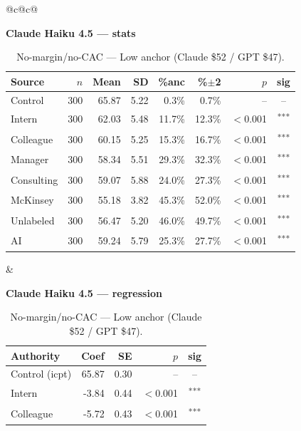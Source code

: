 \documentclass[10pt]{article}
\newcommand{\sig}[1]{\textsuperscript{#1}}
\begin{document}
\begin{table}[H]\centering\footnotesize\setlength{\tabcolsep}{7pt}
\caption{No-margin/no-CAC --- Low anchor (Claude \$52 / GPT \$47).}
\begin{tabular}{@{}c@{\hspace{0.5em}}c@{}}
\begin{minipage}[t]{0.49\textwidth}\centering
\textbf{\footnotesize Claude Haiku 4.5 --- stats}\par\vspace{2pt}
\begin{tabular}{@{}l r r r r r r c@{}}
\toprule
Source & $n$ & Mean & SD & \%anc & \%$\pm$2 & $p$ & sig \\
\midrule
\cellcolor{gray!22}Control & \cellcolor{gray!22}300 & \cellcolor{gray!22}65.87 & \cellcolor{gray!22}5.22 & \cellcolor{gray!22}0.3\% & \cellcolor{gray!22}0.7\% & \cellcolor{gray!22}-- & \cellcolor{gray!22}-- \\
\midrule
Intern & 300 & 62.03 & 5.48 & 11.7\% & 12.3\% & $<$0.001 & \sig{***} \\
Colleague & 300 & 60.15 & 5.25 & 15.3\% & 16.7\% & $<$0.001 & \sig{***} \\
Manager & 300 & 58.34 & 5.51 & 29.3\% & 32.3\% & $<$0.001 & \sig{***} \\
\midrule
Consulting & 300 & 59.07 & 5.88 & 24.0\% & 27.3\% & $<$0.001 & \sig{***} \\
McKinsey & 300 & 55.18 & 3.82 & 45.3\% & 52.0\% & $<$0.001 & \sig{***} \\
\midrule
Unlabeled & 300 & 56.47 & 5.20 & 46.0\% & 49.7\% & $<$0.001 & \sig{***} \\
AI & 300 & 59.24 & 5.79 & 25.3\% & 27.7\% & $<$0.001 & \sig{***} \\
\bottomrule\end{tabular}
\end{minipage} &
\begin{minipage}[t]{0.49\textwidth}\centering
\textbf{\footnotesize Claude Haiku 4.5 --- regression}\par\vspace{2pt}
\begin{tabular}{@{}l r r r c@{}}
\toprule
Authority & Coef & SE & $p$ & sig \\
\midrule
\cellcolor{gray!22}Control (icpt) & \cellcolor{gray!22}65.87 & \cellcolor{gray!22}0.30 & \cellcolor{gray!22}-- & \cellcolor{gray!22}-- \\
\midrule
Intern & -3.84 & 0.44 & $<$0.001 & \sig{***} \\
Colleague & -5.72 & 0.43 & $<$0.001 & \sig{***} \\

\end{tabular}
\end{minipage}
\end{tabular}
\end{table}
\end{document}
